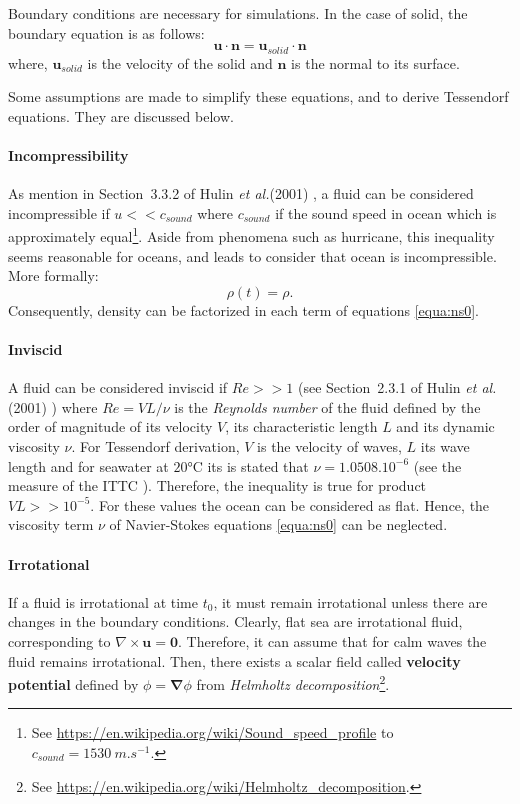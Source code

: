 \documentclass[final]{jcgt}
\def\etal{\emph{et al.}\xspace}
\begin{document}
Boundary conditions are necessary for simulations. In the case of solid, the boundary equation is as follows:
\begin{equation}
	\mathbf{u}\cdot\mathbf{n} = \mathbf{u}_{solid} \cdot \mathbf{n}
\end{equation}
where, $\mathbf{u}_{solid}$ is the velocity of the solid and $\mathbf{n}$ is the normal to its surface.

Some assumptions are made to simplify these equations, and to derive Tessendorf equations.
They are discussed below.

\paragraph{Incompressibility}
As mention in Section~3.3.2 of Hulin \etal (2001) \cite{hulinHydrodynamiquePhysique2001}, a fluid can be considered incompressible if $u<<c_{sound}$ where $c_{sound}$ if the sound speed in ocean which is approximately equal\footnote{See \url{https://en.wikipedia.org/wiki/Sound_speed_profile} to $c_{sound} = 1530~m.s^{-1}$.}.
Aside from phenomena such as hurricane, this inequality seems reasonable for oceans, and leads to consider that ocean is incompressible.
More formally:
\begin{equation}
	\rho(t)=\rho.
\end{equation}
Consequently, density can be factorized in each term of equations \ref{equa:ns0}.

\paragraph{Inviscid}
A fluid can be considered inviscid if $Re>>1$ (see Section~2.3.1 of Hulin \etal (2001) \cite{hulinHydrodynamiquePhysique2001}) where $Re=VL/\nu$ is the \emph{Reynolds number} of the fluid defined by the order of magnitude of its velocity $V$, its characteristic length $L$ and its dynamic viscosity $\nu$.
For Tessendorf derivation, $V$ is the velocity of waves, $L$ its wave length and for seawater at $20$°C its is stated that $\nu=1.0508.10^{-6}$ (see the measure of the ITTC \cite{ittcFreshWaterSeawater2011}).
Therefore, the inequality is true for product $VL >> 10^{-5}$.
For these values the ocean can be considered as flat.
Hence, the viscosity term $\nu$ of Navier-Stokes equations \ref{equa:ns0} can be neglected.

\paragraph{Irrotational}
If a fluid is irrotational at time $t_0$, it must remain irrotational unless there are changes in the boundary conditions.
Clearly, flat sea are irrotational fluid, corresponding to $\nabla\times\mathbf{u} = \mathbf{0}$.
Therefore, it can assume that for calm waves the fluid remains irrotational.
Then, there exists a scalar field called \textbf{velocity potential} defined by $\phi = \mathbf{\nabla} \phi$ from \emph{Helmholtz decomposition}\footnote{See \url{https://en.wikipedia.org/wiki/Helmholtz_decomposition}.}.
\end{document}
